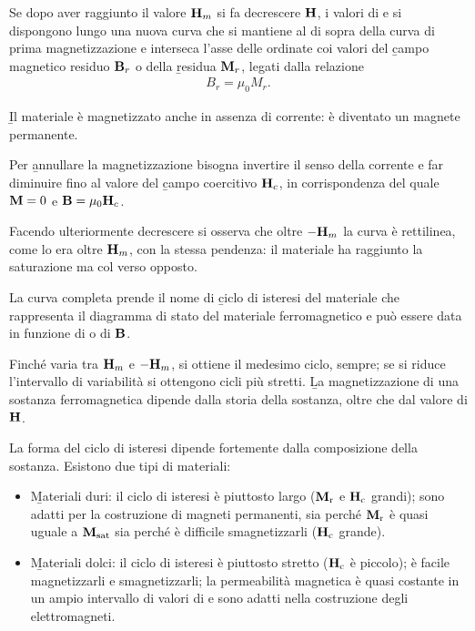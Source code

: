Se dopo aver raggiunto il valore $\mathbf{H}_m$ si fa decrescere $\mathbf{H}$, i valori di \dB e \dM si dispongono lungo una nuova curva che si mantiene al di sopra della curva di prima magnetizzazione e interseca l'asse delle ordinate coi valori del \b{campo magnetico residuo} $\mathbf{B}_r$ o della \b{\magn residua} $\mathbf{M}_r$, legati dalla relazione
\begin{equation}\begin{split}
B_r=\mu_0 M_r.
\end{split}\end{equation}

\b{Il materiale è magnetizzato anche in assenza di corrente: è diventato un magnete permanente}.

Per \b{annullare la magnetizzazione} bisogna invertire il senso della corrente e far diminuire \dH fino al valore del \b{campo coercitivo} $\mathbf{H}_c$, in corrispondenza del quale $\mathbf{M}=0$ e $\mathbf{B}=\mu_0\mathbf{H}_c$.

Facendo ulteriormente decrescere \dH si osserva che oltre $-\mathbf{H}_m$ la curva è rettilinea, come lo era oltre $\mathbf{H}_m$, con la stessa pendenza: il materiale ha raggiunto la saturazione ma col verso opposto.

La curva completa prende il nome di \b{ciclo di isteresi del materiale} che rappresenta il diagramma di stato del materiale ferromagnetico e può essere data in funzione di \dM o di $\mathbf{B}$.

Finché \dH varia tra $\mathbf{H}_m$ e $-\mathbf{H}_m$, si ottiene il medesimo ciclo, sempre; se si riduce l'intervallo di variabilità si ottengono cicli più stretti. \b{La magnetizzazione di una sostanza ferromagnetica dipende dalla storia della sostanza, oltre che dal valore di $\mathbf{H}$}.

La forma del ciclo di isteresi dipende fortemente dalla composizione della sostanza. Esistono due tipi di materiali:
\begin{itemize}
\item \b{Materiali duri}: il ciclo di isteresi è piuttosto largo ($\mathbf{M}_{\textrm{r}}$ e $\mathbf{H}_{\textrm{c}}$ grandi); sono adatti per la costruzione di magneti permanenti, sia perché $\mathbf{M}_{\textrm{r}}$ è quasi uguale a $\mathbf{M}_{\textrm{sat}}$ sia perché è difficile smagnetizzarli ($\mathbf{H}_{\textrm{c}}$ grande).
\item \b{Materiali dolci}: il ciclo di isteresi è piuttosto stretto ($\mathbf{H}_{\textrm{c}}$ è piccolo); è facile magnetizzarli e smagnetizzarli; la permeabilità magnetica è quasi costante in un ampio intervallo di valori di \dH e sono adatti nella costruzione degli elettromagneti.
\end{itemize}

